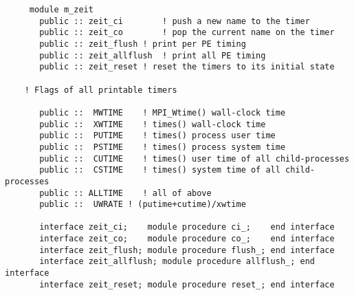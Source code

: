 \begin{verbatim} 
     module m_zeit
       public :: zeit_ci		! push a new name to the timer
       public :: zeit_co		! pop the current name on the timer
       public :: zeit_flush	! print per PE timing
       public :: zeit_allflush	! print all PE timing
       public :: zeit_reset	! reset the timers to its initial state
 
 	! Flags of all printable timers
 
       public ::  MWTIME	! MPI_Wtime() wall-clock time
       public ::  XWTIME	! times() wall-clock time
       public ::  PUTIME	! times() process user time
       public ::  PSTIME	! times() process system time
       public ::  CUTIME	! times() user time of all child-processes
       public ::  CSTIME	! times() system time of all child-processes
       public :: ALLTIME	! all of above
       public ::  UWRATE ! (putime+cutime)/xwtime
 
       interface zeit_ci;    module procedure ci_;    end interface
       interface zeit_co;    module procedure co_;    end interface
       interface zeit_flush; module procedure flush_; end interface
       interface zeit_allflush; module procedure allflush_; end interface
       interface zeit_reset; module procedure reset_; end interface
 \end{verbatim}%
